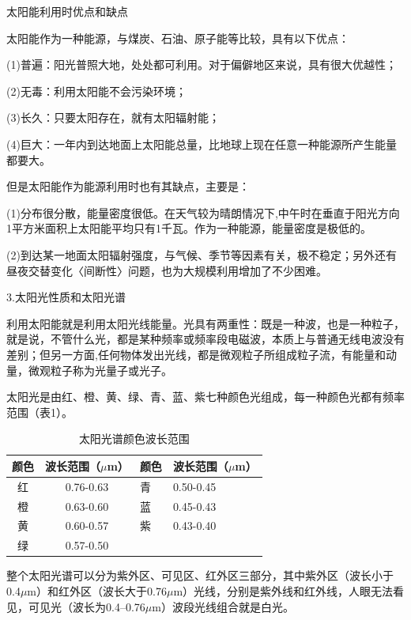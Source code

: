 \documentclass{ctexbook}
\begin{document}
太阳能利用时优点和缺点

太阳能作为一种能源，与煤炭、石油、原子能等比较，具有以下优点：

(1)普遍：阳光普照大地，处处都可利用。对于偏僻地区来说，具有很大优越性；

(2)无毒：利用太阳能不会污染环境；

(3)长久：只要太阳存在，就有太阳辐射能；

(4)巨大：一年内到达地面上太阳能总量，比地球上现在任意一种能源所产生能量都要大。

但是太阳能作为能源利用时也有其缺点，主要是：

(1)分布很分散，能量密度很低。在天气较为晴朗情况下,中午时在垂直于阳光方向1平方米面积上太阳能平均只有1千瓦。作为一种能源，能量密度是极低的。

(2)到达某一地面太阳辐射强度，与气候、季节等因素有关，极不稳定；另外还有昼夜交替变化〈间断性〉问题，也为大规模利用增加了不少困难。

3.太阳光性质和太阳光谱

利用太阳能就是利用太阳光线能量。光具有两重性：既是一种波，也是一种粒子，就是说，不管什么光，都是某种频率或频率段电磁波，本质上与普通无线电波没有差别；但另一方面,任何物体发出光线，都是微观粒子所组成粒子流，有能量和动量，微观粒子称为光量子或光子。

太阳光是由红、橙、黄、绿、青、蓝、紫七种颜色光组成，每一种颜色光都有频率范围（表1）。
\begin{table}[htbp]
	\centering
	\caption{太阳光谱颜色波长范围}
	\begin{tabular}{c|c|c|c}
		\hline
		颜色    & 波长范围（$\mu$m） & \multicolumn{1}{l}{颜色} & \multicolumn{1}{l}{波长范围（$\mu$m）} \\ \hline
		红     & 0.76-0.63 & \multicolumn{1}{l}{青} & \multicolumn{1}{l}{0.50-0.45} \\ \hline
		橙     & 0.63-0.60 & \multicolumn{1}{l}{蓝} & \multicolumn{1}{l}{0.45-0.43} \\ \hline
		黄     & 0.60-0.57 & \multicolumn{1}{l}{紫} & \multicolumn{1}{l}{0.43-0.40} \\ \hline
		绿     & 0.57-0.50 &       &  \\
		\hline
	\end{tabular}%
	\label{tab:bochang}%
\end{table}%

整个太阳光谱可以分为紫外区、可见区、红外区三部分，其中紫外区（波长小于0.4$\mu$m）和红外区（波长大于0.76$\mu$m）光线，分别是紫外线和红外线，人眼无法看见，可见光（波长为0.4--0.76$\mu$m）波段光线组合就是白光。
\end{document}
